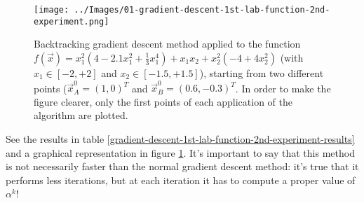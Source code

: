         \begin{figure}
            \centering
            \texttt{[image: ../Images/01-gradient-descent-1st-lab-function-2nd-experiment.png]}
            \caption{Backtracking gradient descent method applied to the function \(f(\vec{x}) = x_1^2(4 - 2.1x_1^2 + \frac{1}{3}x_1^4) + x_1x_2 + x_2^2(-4 + 4x_2^2)\) (with \(x_1 \in [-2, +2]\) and \(x_2 \in [-1.5, +1.5]\)), starting from two different points (\(\vec{x}_A^0 = (1,0)^T\) and \(\vec{x}_B^0 = (0.6, -0.3)^T\). In order to make the figure clearer, only the first points of each application of the algorithm are plotted.}
            \label{gradient-descent-1st-lab-function-2nd-experiment}
        \end{figure}
        See the results in table \ref{gradient-descent-1st-lab-function-2nd-experiment-results} and a graphical representation in figure \ref{gradient-descent-1st-lab-function-2nd-experiment}. It's important to say that this method is not necessarily faster than the normal gradient descent method: it's true that it performs less iterations, but at each iteration it has to compute a proper value of \(\alpha^k\)!
